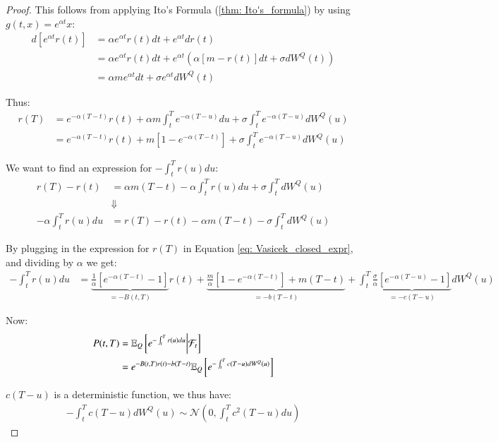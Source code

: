 \begin{proof}
This follows from applying Ito's Formula (\ref{thm: Ito's_formula}) by using  $g(t,x) = e^{\alpha t}x$: 
\begin{align*}
d[e^{\alpha t}r(t)] &= 
\alpha e^{\alpha t}r(t)dt + e^{\alpha t}dr(t) \\ 
&= 
\alpha e^{\alpha t}r(t)dt + e^{\alpha t}\left(\alpha[m - r(t)]dt + \sigma dW^{Q}(t)\right) \\ 
&= 
\alpha m e^{\alpha t}dt + \sigma e^{\alpha t}dW^{Q}(t)
\end{align*}

Thus: 
\begin{align}
\label{eq: Vasicek_closed_expr}
r(T) &= e^{-\alpha(T-t)}r(t) + \alpha m \int_{t}^{T}e^{-\alpha(T-u)}du + \sigma \int_{t}^{T}e^{-\alpha(T-u)}dW^{Q}(u)
\nonumber
\\ 
&= 
e^{-\alpha(T-t)}r(t) + m[1-e^{-\alpha(T-t)}] 
+ \sigma \int_{t}^{T}e^{-\alpha(T-u)}dW^{Q}(u)
\end{align}

We want to find an expression for $-\int_{t}^{T}r(u)du$: 
\begin{align*}
 r(T) - r(t) 
 &= 
 \alpha m(T-t)- \alpha\int_{t}^{T}r(u)du + \sigma\int_{t}^{T}dW^{Q}(u) \\ 
 &\Downarrow \\ 
- \alpha\int_{t}^{T}r(u)du &= 
r(T) - r(t) -\alpha m(T-t)-\sigma \int_{t}^{T}dW^{Q}(u)
\end{align*}

By plugging in the expression for $r(T)$ in Equation \ref{eq: Vasicek_closed_expr}, and dividing by $\alpha$ we get: 
\begin{align*}
-\int_{t}^{T}r(u)du 
&= 
\underbrace{
\frac{1}{\alpha}[e^{-\alpha(T-t)}-1]}_{= -B(t,T)}
r(t) + \underbrace{
\frac{m}{\alpha}[1-e^{-\alpha(T-t)}] + m(T-t)
}_{= -b(T-t)} 
+
\int_{t}^{T}
\underbrace{
\frac{\sigma}{\alpha}[e^{-\alpha(T-u)}-1]
}_{= -c(T-u)}
dW^{Q}(u)
\end{align*}

Now: 
\begin{align*}
P(t,T) 
&= 
\mathbb{E}_{Q}\left[e^{-\int_{t}^{T}r(u)du}\bigg{|}\mathcal{F}_{t}\right] \\ 
&= e^{
-B(t,T)r(t) -b(T-t)
}
\mathbb{E}_{Q}\left[
e^{
-\int_{t}^{T}c(T-u)dW^{Q}(u)
}
\right]
\end{align*}

$c(T-u)$ is a deterministic function, we thus have: 
\begin{align*}
 -\int_{t}^{T}c(T-u)dW^{Q}(u) \sim 
 \mathcal{N}\left(
 0, \int_{t}^{T}c^{2}(T-u)du
 \right)
\end{align*}


\end{proof}
